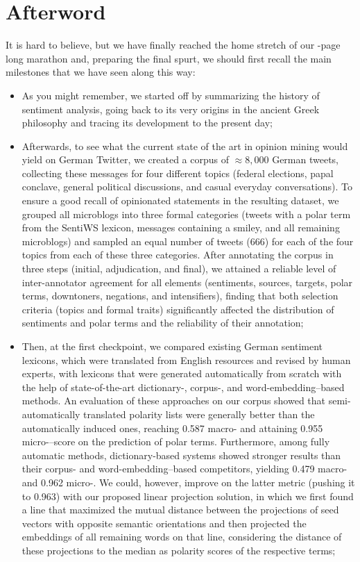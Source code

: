 \chapter*{Afterword}

It is hard to believe, but we have finally reached the home stretch of
our \thepage-page long marathon and, preparing the final spurt, we
should first recall the main milestones that we have seen along this
way:
\begin{itemize}
\item As you might remember, we started off by summarizing the history
  of sentiment analysis, going back to its very origins in the ancient
  Greek philosophy and tracing its development to the present day;

\item Afterwards, to see what the current state of the art in opinion
  mining would yield on German Twitter, we created a corpus of
  $\approx8,000$ German tweets, collecting these messages for four
  different topics (federal elections, papal conclave, general
  political discussions, and casual everyday conversations).  To
  ensure a good recall of opinionated statements in the resulting
  dataset, we grouped all microblogs into three formal categories
  (tweets with a polar term from the SentiWS lexicon, messages
  containing a smiley, and all remaining microblogs) and sampled an
  equal number of tweets (666) for each of the four topics from each
  of these three categories.  After annotating the corpus in three
  steps (initial, adjudication, and final), we attained a reliable
  level of inter-annotator agreement for all elements (sentiments,
  sources, targets, polar terms, downtoners, negations, and
  intensifiers), finding that both selection criteria (topics and
  formal traits) significantly affected the distribution of sentiments
  and polar terms and the reliability of their annotation;

\item Then, at the first checkpoint, we compared existing German
  sentiment lexicons, which were translated from English resources and
  revised by human experts, with lexicons that were generated
  automatically from scratch with the help of state-of-the-art
  dictionary\mbox{-,} corpus\mbox{-,} and word-embedding--based
  methods.  An evaluation of these approaches on our corpus showed
  that semi-automatically translated polarity lists were generally
  better than the automatically induced ones, reaching 0.587
  macro-\F{} and attaining 0.955 micro-\F{}--score on the prediction
  of polar terms.  Furthermore, among fully automatic methods,
  dictionary-based systems showed stronger results than their corpus-
  and word-embedding--based competitors, yielding 0.479 macro-\F{} and
  0.962 micro-\F{}.  We could, however, improve on the latter metric
  (pushing it to 0.963) with our proposed linear projection solution,
  in which we first found a line that maximized the mutual distance
  between the projections of seed vectors with opposite semantic
  orientations and then projected the embeddings of all remaining
  words on that line, considering the distance of these projections to
  the median as polarity scores of the respective terms;


\end{itemize}
